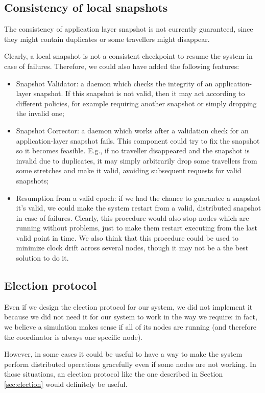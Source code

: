 \subsection{Consistency of local snapshots}
The consistency of application layer snapshot is not currently guaranteed,
since they might contain duplicates or some travellers might disappear.

Clearly, a local snapshot is not a consistent checkpoint to resume the system
in case of failures. Therefore, we could also have added the following
features:

\begin{itemize}
  \item Snapshot Validator: a daemon which checks the integrity of an
        application-layer snapshot. If this snapshot is not valid, then it may
        act according to different policies, for example requiring another
        snapshot or simply dropping the invalid one;
  \item Snapshot Corrector: a daemon which works after a validation check for
        an application-layer snapshot fails. This component could try to fix
        the snapshot so it becomes feasible. E.g., if no traveller disappeared
        and the snapshot is invalid due to duplicates, it may simply
        arbitrarily drop some travellers from some stretches and make it valid,
        avoiding subsequent requests for valid snapshots;
  \item Resumption from a valid epoch: if we had the chance to guarantee a
        snapshot it's valid, we could make the system restart from a valid,
        distributed snapshot in case of failures. Clearly, this procedure would
        also stop nodes which are running without problems, just to make them
        restart executing from the last valid point in time.
        We also think that this procedure could be used to minimize clock
        drift across several nodes, though it may not be a the best solution
        to do it.
\end{itemize}

\subsection{Election protocol}
Even if we design the election protocol for our system, we did not implement it
because we did not need it for our system to work in the way we require: in
fact, we believe a simulation makes sense if all of its nodes are running (and
therefore the coordinator is always one specific node).

However, in some cases it could be useful to have a way to make the system
perform distributed operations gracefully even if some nodes are not working.
In those situations, an election protocol like the one described in Section
\ref{sec:election} would definitely be useful.
